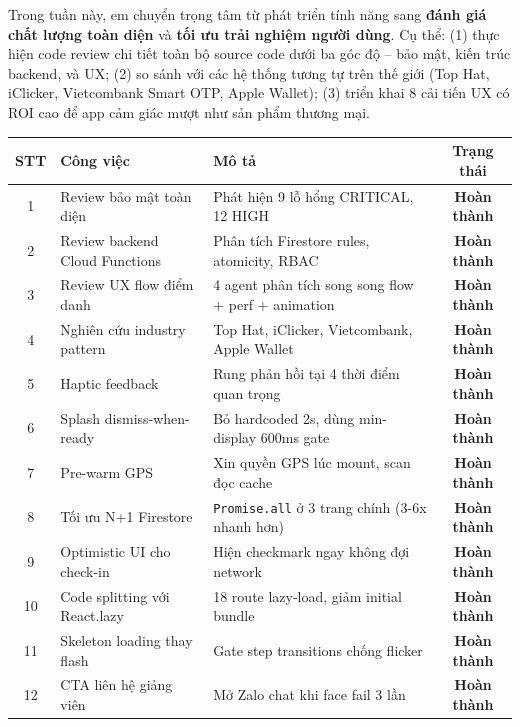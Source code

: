 \documentclass{article}
\begin{document}
Trong tuần này, em chuyển trọng tâm từ phát triển tính năng sang \textbf{đánh giá chất lượng toàn diện} và \textbf{tối ưu trải nghiệm người dùng}. Cụ thể: (1) thực hiện code review chi tiết toàn bộ source code dưới ba góc độ -- bảo mật, kiến trúc backend, và UX; (2) so sánh với các hệ thống tương tự trên thế giới (Top Hat, iClicker, Vietcombank Smart OTP, Apple Wallet); (3) triển khai 8 cải tiến UX có ROI cao để app cảm giác mượt như sản phẩm thương mại.

\begin{center}
\begin{tabularx}{\textwidth}{@{}c l X c@{}}
\toprule
\textbf{STT} & \textbf{Công việc} & \textbf{Mô tả} & \textbf{Trạng thái} \\
\midrule
1 & Review bảo mật toàn diện & Phát hiện 9 lỗ hổng CRITICAL, 12 HIGH & \textcolor{statusgreen}{\textbf{Hoàn thành}} \\
2 & Review backend Cloud Functions & Phân tích Firestore rules, atomicity, RBAC & \textcolor{statusgreen}{\textbf{Hoàn thành}} \\
3 & Review UX flow điểm danh & 4 agent phân tích song song flow + perf + animation & \textcolor{statusgreen}{\textbf{Hoàn thành}} \\
4 & Nghiên cứu industry pattern & Top Hat, iClicker, Vietcombank, Apple Wallet & \textcolor{statusgreen}{\textbf{Hoàn thành}} \\
5 & Haptic feedback & Rung phản hồi tại 4 thời điểm quan trọng & \textcolor{statusgreen}{\textbf{Hoàn thành}} \\
6 & Splash dismiss-when-ready & Bỏ hardcoded 2s, dùng min-display 600ms gate & \textcolor{statusgreen}{\textbf{Hoàn thành}} \\
7 & Pre-warm GPS & Xin quyền GPS lúc mount, scan đọc cache & \textcolor{statusgreen}{\textbf{Hoàn thành}} \\
8 & Tối ưu N+1 Firestore & \texttt{Promise.all} ở 3 trang chính (3-6x nhanh hơn) & \textcolor{statusgreen}{\textbf{Hoàn thành}} \\
9 & Optimistic UI cho check-in & Hiện checkmark ngay không đợi network & \textcolor{statusgreen}{\textbf{Hoàn thành}} \\
10 & Code splitting với React.lazy & 18 route lazy-load, giảm initial bundle & \textcolor{statusgreen}{\textbf{Hoàn thành}} \\
11 & Skeleton loading thay flash & Gate step transitions chống flicker & \textcolor{statusgreen}{\textbf{Hoàn thành}} \\
12 & CTA liên hệ giảng viên & Mở Zalo chat khi face fail 3 lần & \textcolor{statusgreen}{\textbf{Hoàn thành}} \\
\bottomrule
\end{tabularx}
\end{center}
\end{document}
